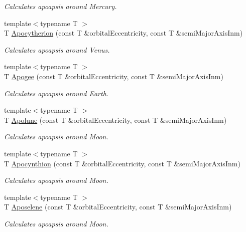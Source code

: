 \begin{DoxyCompactItemize}
\begin{DoxyCompactList}\small\item\em Calculates apoapsis around Mercury. \end{DoxyCompactList}\item 
{\footnotesize template$<$typename T $>$ }\\T \mbox{\hyperlink{group___e_g_x_phys-_apoapsis_ga75bd80071f792bd75d609fec8dca17b1}{Apocytherion}} (const T \&orbital\+Eccentricity, const T \&semi\+Major\+Axis\+Inm)
\begin{DoxyCompactList}\small\item\em Calculates apoapsis around Venus. \end{DoxyCompactList}\item 
{\footnotesize template$<$typename T $>$ }\\T \mbox{\hyperlink{group___e_g_x_phys-_apoapsis_ga5bb3b3a83de372ffaf9af3ab77d6f408}{Apogee}} (const T \&orbital\+Eccentricity, const T \&semi\+Major\+Axis\+Inm)
\begin{DoxyCompactList}\small\item\em Calculates apoapsis around Earth. \end{DoxyCompactList}\item 
{\footnotesize template$<$typename T $>$ }\\T \mbox{\hyperlink{group___e_g_x_phys-_apoapsis_gac82e5aebcf63e5113ddefe648f40ef2e}{Apolune}} (const T \&orbital\+Eccentricity, const T \&semi\+Major\+Axis\+Inm)
\begin{DoxyCompactList}\small\item\em Calculates apoapsis around Moon. \end{DoxyCompactList}\item 
{\footnotesize template$<$typename T $>$ }\\T \mbox{\hyperlink{group___e_g_x_phys-_apoapsis_ga44b6d3e3280b5a59e1cfb53b65673075}{Apocynthion}} (const T \&orbital\+Eccentricity, const T \&semi\+Major\+Axis\+Inm)
\begin{DoxyCompactList}\small\item\em Calculates apoapsis around Moon. \end{DoxyCompactList}\item 
{\footnotesize template$<$typename T $>$ }\\T \mbox{\hyperlink{group___e_g_x_phys-_apoapsis_gaf13528a3ed48f6e85f4ba5735edc1163}{Aposelene}} (const T \&orbital\+Eccentricity, const T \&semi\+Major\+Axis\+Inm)
\begin{DoxyCompactList}\small\item\em Calculates apoapsis around Moon. \end{DoxyCompactList}\item 

\end{DoxyCompactItemize}
